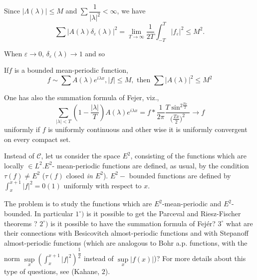 Since $|\Lambda (\lambda)| \leq M$ and $\sum \dfrac{1}{|\lambda|^2} <
\infty$, we have 
$$
\sum |A (\lambda) \delta_{\varepsilon} (\lambda)|^2 = \lim_{T
 \to \infty} \frac{1}{2T} \int^{T}_{-T} |f_{\varepsilon}|^2 \leq
M^2. 
$$

When $\varepsilon \to 0$, $\delta_{\varepsilon} (\lambda)\to 1$ and so 

\begin{theorem*}
 If\pageoriginale $f$ is a bounded mean-periodic function,
 $$
 f \sim \sum A (\lambda) e^{i \lambda x}, |f| \le M, \text { then }
 \sum | A (\lambda) |^2 \le M^2 
 $$ 
  
 One has also the summation formula of Fejer, viz., 
 $$
 \sum_{|\lambda| < T} \left(1 - \frac{|\lambda|}{T}\right) A (\lambda) e^{i
 \lambda x} = f \ast \frac{1}{2 \pi } \frac{T \sin^{
  2\frac{Tx}{2}}}{\bigg(\frac{Tx}{2}\bigg)^2} \to f 
 $$
 uniformly if $f$ is uniformly continuous and other wise it is
 uniformly convergent on every compact set. 
\end{theorem*}

Instead of $\mathscr{C}$, let us consider the space $E^2$, consisting
of the functions which are locally $\in L^2. E^2$- mean-periodic
functions are defined, as usual, by the condition $\tau (f) \neq E^2$
 ($\tau (f)$ closed \textit{in $E^2$}). $E^2-$ bounded functions are
defined by $\int^{x + 1}_{x} |f|^2 = 0 (1)$ uniformly with respect to
$x$. 

The problem is to study the functions which are $E^2$-mean-periodic
and $E^2$-bounded. In particular $1^\circ)$ is it possible to get the
Parceval and Riesz-Fischer theorems ? $2^\circ)$ is it possible to
have the summation formula of Fej\'er? $3^\circ$ what are their
connections with Besicovitch almost-periodic functions and with
Stepanoff almost-periodic functions (which are analogous to Bohr
a.p. functions, with the norm $\sup\limits_{x} (\int^{x + 1}_{x}
|f|^2)^{\dfrac{1}{2}}$ instead of $\sup\limits_{x} |f (x) |$)? For
more details about this type of questions, see (Kahane, $2$). 
